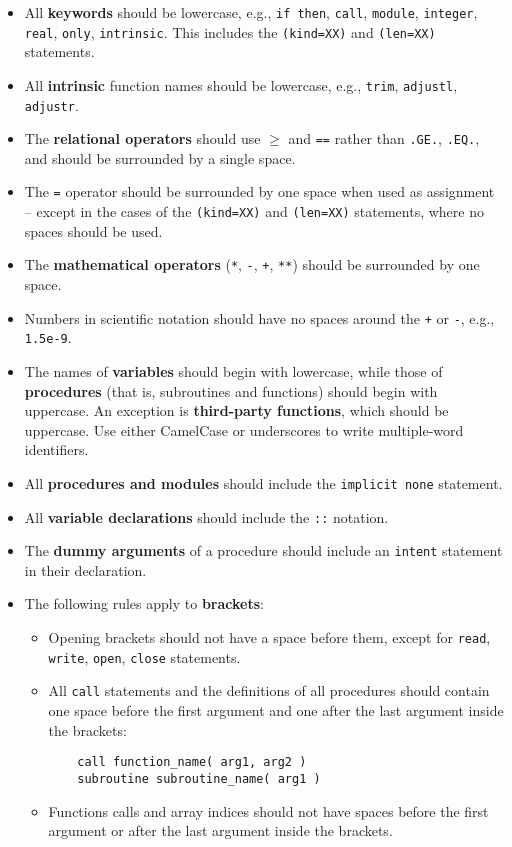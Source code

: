 \begin{itemize}
\item All \textbf{keywords} should be lowercase, e.g., \texttt{if\
    then}, \texttt{call}, \texttt{module}, \texttt{integer},
  \texttt{real}, \texttt{only}, \texttt{intrinsic}. This includes the
  \texttt{(kind=XX)} and \texttt{(len=XX)} statements.
\item All \textbf{intrinsic} function names should be lowercase, e.g.,
  \texttt{trim}, \texttt{adjustl}, \texttt{adjustr}.
\item The \textbf{relational operators} should use \texttt{$\geq$} and
  \texttt{==} rather than \texttt{.GE.}, \texttt{.EQ.}, and should be
  surrounded by a single space.
\item The \texttt{=} operator should be surrounded by one space when
  used as assignment -- except in the cases of the \texttt{(kind=XX)}
  and \texttt{(len=XX)} statements, where no spaces should be used.
\item The \textbf{mathematical operators} (\texttt{*}, \texttt{-},
  \texttt{+}, \texttt{**}) should be surrounded by one space.
\item Numbers in scientific notation should have no spaces around the
  \texttt{+} or \texttt{-}, e.g., \texttt{1.5e-9}.
\item The names of \textbf{variables} should begin with lowercase,
  while those of \textbf{procedures} (that is, subroutines and
  functions) should begin with uppercase. An exception is
  \textbf{third-party functions}, which should be uppercase. Use
  either CamelCase or underscores to write multiple-word identifiers.
\item All \textbf{procedures and modules} should include the
  \texttt{implicit none} statement.
\item All \textbf{variable declarations} should include the
  \texttt{::} notation.
\item The \textbf{dummy arguments} of a procedure should include an
  \texttt{intent} statement in their declaration.
\item The following rules apply to \textbf{brackets}:
  \begin{itemize}
  \item Opening brackets should not have a space before them, except
    for \texttt{read}, \texttt{write}, \texttt{open}, \texttt{close}
    statements.
  \item All \texttt{call} statements and the definitions of all
    procedures should contain one space before the first argument and
    one after the last argument inside the brackets:
    \begin{verbatim}
    call function_name( arg1, arg2 )
    subroutine subroutine_name( arg1 )
    \end{verbatim}
  \item Functions calls and array indices should not have spaces
    before the first argument or after the last argument inside the
    brackets.
  \end{itemize}
\end{itemize}
